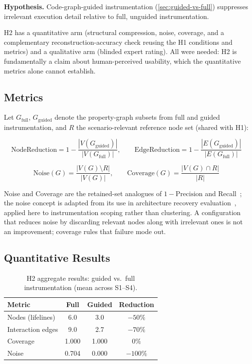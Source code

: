 \textbf{Hypothesis.} Code-graph-guided instrumentation
(\cref{sec:guided-vs-full}) suppresses irrelevant execution detail
relative to full, unguided instrumentation.

H2 has a quantitative arm (structural compression, noise, coverage, and
a complementary reconstruction-accuracy check reusing the H1 conditions
and metrics) and a qualitative arm (blinded expert rating). All were
needed: H2 is fundamentally a claim about human-perceived usability,
which the quantitative metrics alone cannot establish.

\subsection{Metrics}

Let $G_{\text{full}}$, $G_{\text{guided}}$ denote the property-graph
subsets from full and guided instrumentation, and $R$ the
scenario-relevant reference node set (shared with H1):

\[
  \text{NodeReduction} = 1 - \frac{|V(G_{\text{guided}})|}{|V(G_{\text{full}})|},
  \qquad
  \text{EdgeReduction} = 1 - \frac{|E(G_{\text{guided}})|}{|E(G_{\text{full}})|}
\]

\[
  \text{Noise}(G) = \frac{|V(G) \setminus R|}{|V(G)|},
  \qquad
  \text{Coverage}(G) = \frac{|V(G) \cap R|}{|R|}
\]

Noise and Coverage are the retained-set analogues of $1-\text{Precision}$
and Recall~\cite{manning:ir}; the noise concept is adapted from its use
in architecture recovery evaluation~\cite{constantinou:noise}, applied
here to instrumentation scoping rather than clustering. A configuration
that reduces noise by discarding relevant nodes along with irrelevant
ones is not an improvement; coverage rules that failure mode out.

\subsection{Quantitative Results}\label{sec:h2-results}

\begin{table}[htb]
\centering
\caption{H2 aggregate results: guided vs.\ full instrumentation (mean across
  S1--S4).}
\label{tab:h2-results}
\begin{tabular}{@{} l c c c @{}}
\toprule
\textbf{Metric} & \textbf{Full} & \textbf{Guided} & \textbf{Reduction} \\
\midrule
Nodes (lifelines)     & 6.0 & 3.0 & $-50\%$ \\
Interaction edges     & 9.0 & 2.7 & $-70\%$ \\
Coverage              & 1.000 & 1.000 & $0\%$ \\
Noise                 & 0.704 & 0.000 & $-100\%$ \\
\bottomrule
\end{tabular}
\end{table}

